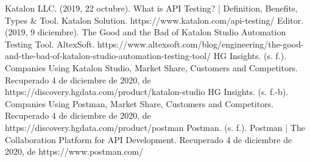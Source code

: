 \documentclass[twoside,twocolumn]{article}
\begin{document}
\begin{thebibliography}{99} 

\bibitem[1]{}
\newblock Katalon LLC. (2019, 22 octubre). What is API Testing? | Definition, Benefits, Types \& Tool. Katalon Solution. https://www.katalon.com/api-testing/
\bibitem[2]{}
\newblock Editor. (2019, 9 diciembre). The Good and the Bad of Katalon Studio Automation Testing Tool. AltexSoft. https://www.altexsoft.com/blog/engineering/the-good-and-the-bad-of-katalon-studio-automation-testing-tool/
\bibitem[3]{}
\newblock HG Insights. (s. f.). Companies Using Katalon Studio, Market Share, Customers and Competitors. Recuperado 4 de diciembre de 2020, de https://discovery.hgdata.com/product/katalon-studio
\bibitem[4]{}
\newblock HG Insights. (s. f.-b). Companies Using Postman, Market Share, Customers and Competitors. Recuperado 4 de diciembre de 2020, de https://discovery.hgdata.com/product/postman
\bibitem[5]{}
\newblock Postman. (s. f.). Postman | The Collaboration Platform for API Development. Recuperado 4 de diciembre de 2020, de https://www.postman.com/
\end{thebibliography}


\end{document}
